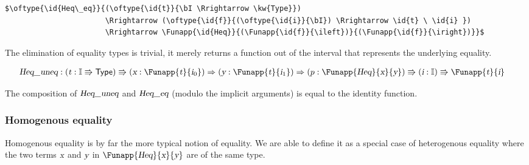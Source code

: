 \documentclass[11pt]{article}
\newcommand\kw[1] {\textsf{#1}}
\newcommand\id[1] {\textsl{#1}}
\begin{document}

\begin{lstlisting}
$\oftype{\id{Heq\_eq}}{(\oftype{\id{t}}{\bI \Rrightarrow \kw{Type}})
		               \Rrightarrow (\oftype{\id{f}}{(\oftype{\id{i}}{\bI}) \Rrightarrow \id{t} \ \id{i} })
		               \Rrightarrow \Funapp{\id{Heq}}{(\Funapp{\id{f}}{\ileft})}{(\Funapp{\id{f}}{\iright})}}$
\end{lstlisting}

The elimination of equality types is trivial, it merely returns a function out of the interval that represents the underlying equality.

\begin{align*}
\id{Heq\_uneq} & : (\oftype{\id{t}}{\bI \Rrightarrow \kw{Type}})
			       \Rrightarrow (\oftype{\id{x}}{\Funapp{\id{t}}{\ileft}})
			       \Rightarrow (\oftype{\id{y}}{\Funapp{\id{t}}{\iright}})
			       \Rightarrow (\oftype{p}{\Funapp{\id{Heq}}{\id{x}}{\id{y}}})
			       \Rrightarrow (\oftype{\id{i}}{\bI}) \Rrightarrow \Funapp{\id{t}}{\id{i}}
\end{align*}

The composition of $\id{Heq\_uneq}$ and  $\id{Heq\_eq}$ (modulo the implicit arguments) is equal to the identity function.

\subsubsection{Homogenous equality}
Homogenous equality is by far the more typical notion of equality. We are able to define it as a special case of heterogenous equality where the two terms $\id{x}$ and $\id{y}$ in $\Funapp{\id{Heq}}{\id{x}}{\id{y}}$ are of the same type.
\end{document}
